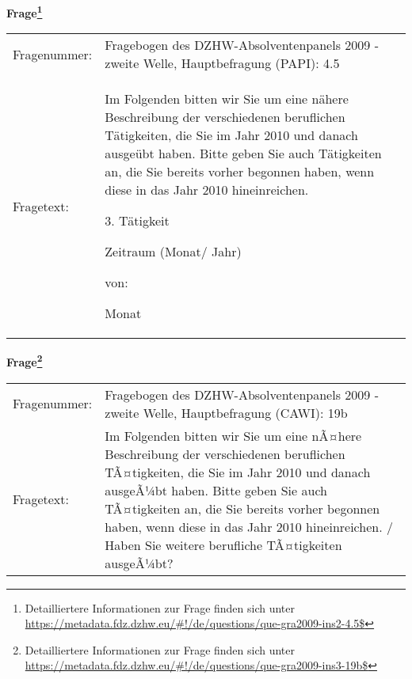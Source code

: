 				\vspace*{0.5cm}
                \noindent\textbf{Frage\footnote{Detailliertere Informationen zur Frage finden sich unter
		              \url{https://metadata.fdz.dzhw.eu/\#!/de/questions/que-gra2009-ins2-4.5$}}}\\
				\begin{tabularx}{\hsize}{@{}lX}
					Fragenummer: &
					  Fragebogen des DZHW-Absolventenpanels 2009 - zweite Welle, Hauptbefragung (PAPI):
					  4.5
 \\
					Fragetext: & Im Folgenden bitten wir Sie um eine nähere Beschreibung der verschiedenen beruflichen Tätigkeiten, die Sie im Jahr 2010 und danach ausgeübt haben. Bitte geben Sie auch Tätigkeiten an, die Sie bereits vorher begonnen haben, wenn diese in das Jahr 2010 hineinreichen.\par  3. Tätigkeit\par  Zeitraum (Monat/ Jahr)\par  von:\par  Monat \\
				\end{tabularx}
				\vspace*{0.5cm}
                \noindent\textbf{Frage\footnote{Detailliertere Informationen zur Frage finden sich unter
		              \url{https://metadata.fdz.dzhw.eu/\#!/de/questions/que-gra2009-ins3-19b$}}}\\
				\begin{tabularx}{\hsize}{@{}lX}
					Fragenummer: &
					  Fragebogen des DZHW-Absolventenpanels 2009 - zweite Welle, Hauptbefragung (CAWI):
					  19b
 \\
					Fragetext: & Im Folgenden bitten wir Sie um eine nÃ¤here Beschreibung der verschiedenen beruflichen TÃ¤tigkeiten, die Sie im Jahr 2010 und danach ausgeÃ¼bt haben. Bitte geben Sie auch TÃ¤tigkeiten an, die Sie bereits vorher begonnen haben, wenn diese in das Jahr 2010 hineinreichen. / Haben Sie weitere berufliche TÃ¤tigkeiten ausgeÃ¼bt? \\
				\end{tabularx}





